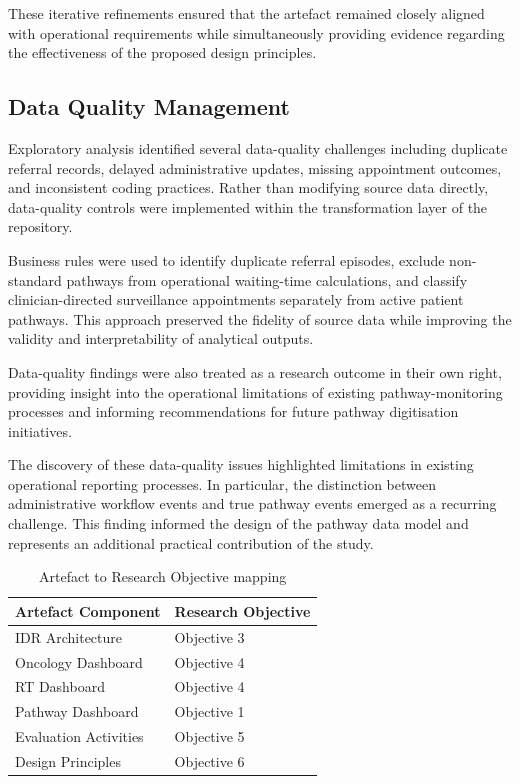 These iterative refinements ensured that the artefact remained closely aligned with operational requirements while simultaneously providing evidence regarding the effectiveness of the proposed design principles.



\subsection{Data Quality Management}

Exploratory analysis identified several data-quality challenges including duplicate referral records, delayed administrative updates, missing appointment outcomes, and inconsistent coding practices. Rather than modifying source data directly, data-quality controls were implemented within the transformation layer of the repository. 

Business rules were used to identify duplicate referral episodes, exclude non-standard pathways from operational waiting-time calculations, and classify clinician-directed surveillance appointments separately from active patient pathways. This approach preserved the fidelity of source data while improving the validity and interpretability of analytical outputs. 

Data-quality findings were also treated as a research outcome in their own right, providing insight into the operational limitations of existing pathway-monitoring processes and informing recommendations for future pathway digitisation initiatives.

The discovery of these data-quality issues highlighted limitations in existing operational reporting processes. In particular, the distinction between administrative workflow events and true pathway events emerged as a recurring challenge. This finding informed the design of the pathway data model and represents an additional practical contribution of the study.

\begin{table}[h]
    \centering
    \begin{tabular}{|p{7cm}|p{7cm}|}
        \hline
        \textbf{Artefact Component} & \textbf{Research Objective} \\
        \hline\hline
        IDR Architecture & Objective 3 \\
        Oncology Dashboard & Objective 4 \\
        RT Dashboard & Objective 4 \\
        Pathway Dashboard & Objective 1 \\
        Evaluation Activities & Objective 5 \\
        Design Principles & Objective 6 \\
        \hline
    \end{tabular}
    \caption{Artefact to Research Objective mapping}
    \label{tab:art-obj-map}
\end{table}

